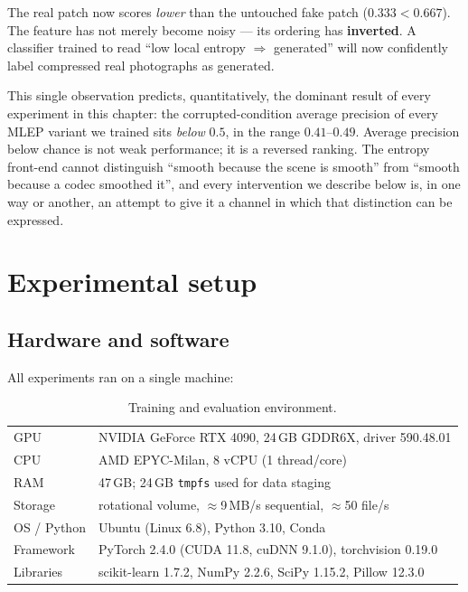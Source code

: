 The real patch now scores \emph{lower} than the untouched fake patch
($0.333 < 0.667$). The feature has not merely become noisy --- its ordering has
\textbf{inverted}. A classifier trained to read ``low local entropy $\Rightarrow$
generated'' will now confidently label compressed real photographs as
generated.

This single observation predicts, quantitatively, the dominant result of every
experiment in this chapter: the corrupted-condition average precision of every
MLEP variant we trained sits \emph{below} $0.5$, in the range $0.41$--$0.49$.
Average precision below chance is not weak performance; it is a reversed
ranking. The entropy front-end cannot distinguish ``smooth because the scene is
smooth'' from ``smooth because a codec smoothed it'', and every intervention we
describe below is, in one way or another, an attempt to give it a channel in
which that distinction can be expressed.

\section{Experimental setup}
\label{sec:setup}

\subsection{Hardware and software}

All experiments ran on a single machine:

\begin{table}[h]
  \centering
  \caption{Training and evaluation environment.}
  \label{tab:hardware}
  \begin{tabular}{ll}
    \toprule
    GPU              & NVIDIA GeForce RTX 4090, 24\,GB GDDR6X, driver 590.48.01 \\
    CPU              & AMD EPYC-Milan, 8 vCPU (1 thread/core) \\
    RAM              & 47\,GB; 24\,GB \texttt{tmpfs} used for data staging \\
    Storage          & rotational volume, $\approx$9\,MB/s sequential, $\approx$50 file/s \\
    OS / Python      & Ubuntu (Linux 6.8), Python 3.10, Conda \\
    Framework        & PyTorch 2.4.0 (CUDA 11.8, cuDNN 9.1.0), torchvision 0.19.0 \\
    Libraries        & scikit-learn 1.7.2, NumPy 2.2.6, SciPy 1.15.2, Pillow 12.3.0 \\
    \bottomrule
  \end{tabular}
\end{table}

